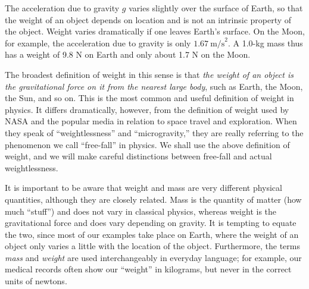 \documentclass[
]{book}
\begin{document}
The acceleration due to gravity \(g{}\)\emph{}
varies slightly over the surface of Earth, so that the weight of an
object depends on location and is not an intrinsic property of the
object. Weight varies dramatically if one leaves Earth's surface. On the
Moon, for example, the acceleration due to gravity is only
\({1.67\ \text{m/s}^{2}}{}\). A 1.0-kg mass thus has a weight of 9.8 N on
Earth and only about 1.7 N on the Moon.

The broadest definition of weight in this sense is that \emph{the weight of
an object is the gravitational force on it from the nearest large body},
such as Earth, the Moon, the Sun, and so on. This is the most common and
useful definition of weight in physics. It differs dramatically,
however, from the definition of weight used by NASA and the popular
media in relation to space travel and exploration. When they speak of
``weightlessness'' and ``microgravity,'' they are really referring to the
phenomenon we call ``free-fall'' in physics. We shall use the above
definition of weight, and we will make careful distinctions between
free-fall and actual weightlessness.

It is important to be aware that weight and mass are very different
physical quantities, although they are closely related. Mass is the
quantity of matter (how much ``stuff'') and does not vary in classical
physics, whereas weight is the gravitational force and does vary
depending on gravity. It is tempting to equate the two, since most of
our examples take place on Earth, where the weight of an object only
varies a little with the location of the object. Furthermore, the terms
\emph{mass} and \emph{weight} are used interchangeably in everyday language; for
example, our medical records often show our ``weight'' in kilograms, but
never in the correct units of newtons.
\end{document}
